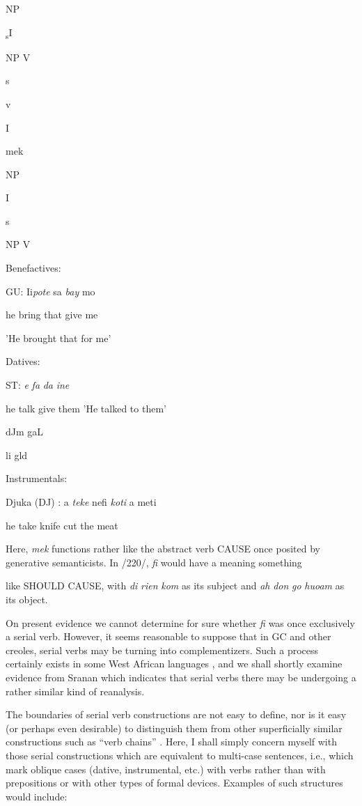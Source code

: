 \ea\label{ex:222}

\glt
\z

NP

\textsubscript{s}I

NP V

s 

v

I

mek

NP

I

s

NP V

\ea\label{ex:224}
 Benefactives:
\glt
\z

GU: Ii\textit{pote} sa \textit{bay} mo

he bring that give me

'He brought that for me'

\ea\label{ex:225}
 Datives:
\glt
\z

ST: \textit{e} \textit{fa} \textit{da} \textit{ine}

he talk give them 'He talked to them'

dJm gaL

li gld

\ea\label{ex:226}
 Instrumentals:
\glt
\z

Djuka (DJ) : a \textit{teke} nefi \textit{koti} a meti

he take knife cut the meat

Here, \textit{mek} functions rather like the abstract verb CAUSE once posited by generative semanticists. In /220/, \textit{fi} would have a meaning something

like SHOULD CAUSE, with \textit{di} \textit{rien} \textit{k}\textit{om} as its subject and \textit{ah} \textit{don} \textit{go} \textit{huoam} as its object.

On present evidence we cannot determine for sure whether \textit{fi}
was once exclusively a serial verb. However, it seems reasonable to suppose that in GC and other creoles, serial verbs may be turning into complementizers. Such a process certainly exists in some West African languages \citep{Lord1976}, and we shall shortly examine evidence from Sranan which indicates that serial verbs there may be undergoing a rather similar kind of reanalysis.

The boundaries of serial verb constructions are not easy to define, nor is it easy (or perhaps even desirable) to distinguish them from other superficially similar constructions such as ``verb chains'' \citep{Forman1972}. Here, I shall simply concern myself with those serial constructions which are equivalent to multi-case sentences, i.e., which mark oblique cases (dative, instrumental, etc.) with verbs rather than with prepositions or with other types of formal devices. Examples of such structures would include:

